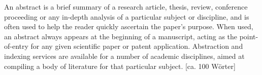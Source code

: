An abstract is a brief summary of a research article, thesis, review, conference proceeding or any in-depth analysis of a particular subject or discipline, and is often used to help the reader quickly ascertain the paper's purpose. When used, an abstract always appears at the beginning of a manuscript, acting as the point-of-entry for any given scientific paper or patent application. Abstraction and indexing services are available for a number of academic disciplines, aimed at compiling a body of literature for that particular subject. [ca. 100 Wörter]